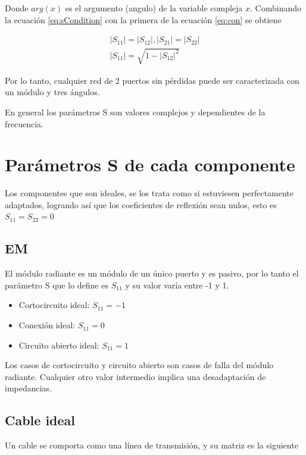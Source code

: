 \begin{itemize}
Donde $arg(x)$ es el argumento (angulo) de la variable compleja $x$. Combinando la ecuación \ref{eq:sCondition} con la primera
de la ecuación \ref{eq:con} se obtiene

\begin{equation}
\begin{aligned}
	|S_{11}| = |S_{12}|, |S_{21}| = |S_{22}| \\
	|S_{11}| = \sqrt{1 - |S_{12}|^2}
\end{aligned}
\end{equation}

Por lo tanto, cualquier red de 2 puertos sin pérdidas puede ser caracterizada con un módulo y tres ángulos.
\end{itemize}

En general los parámetros S son valores complejos y dependientes de la frecuencia.

\section{Parámetros S de cada componente}

Los componentes que son ideales, se los trata como si estuviesen perfectamente adaptados, logrando así que los coeficientes
de reflexión sean nulos, esto es $S_{11} = S_{22} = 0$

\subsection{EM}

El módulo radiante es un módulo de un único puerto y es pasivo, por lo tanto el parámetro S que lo define es $S_{11}$ y su
valor varía entre -1 y 1.

\begin{itemize}
	\item Cortocircuito ideal: $S_{11} = -1$
	\item Conexión ideal: $S_{11} = 0$
	\item Circuito abierto ideal: $S_{11} = 1$
\end{itemize}

Los casos de cortocircuito y circuito abierto son casos de falla del módulo radiante. Cualquier otro valor intermedio implica
una desadaptación de impedancias.

\subsection{Cable ideal}
Un cable se comporta como una línea de transmisión, y su matriz es la siguiente

